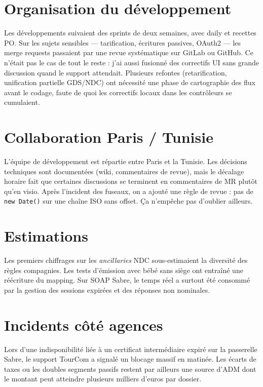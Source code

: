 \section{Organisation du développement}

Les développements suivaient des sprints de deux semaines, avec daily et recettes PO. Sur les sujets sensibles --- tarification, écritures passives, OAuth2 --- les merge requests passaient par une revue systématique sur GitLab ou GitHub. Ce n'était pas le cas de tout le reste : j'ai aussi fusionné des correctifs UI sans grande discussion quand le support attendait. Plusieurs refontes (retarification, unification partielle GDS/NDC) ont nécessité une phase de cartographie des flux avant le codage, faute de quoi les correctifs locaux dans les contrôleurs se cumulaient.

\section{Collaboration Paris / Tunisie}

L'équipe de développement est répartie entre Paris et la Tunisie. Les décisions techniques sont documentées (wiki, commentaires de revue), mais le décalage horaire fait que certaines discussions se terminent en commentaires de MR plutôt qu'en visio. Après l'incident des fuseaux, on a ajouté une règle de revue : pas de \texttt{new Date()} sur une chaîne ISO sans offset. Ça n'empêche pas d'oublier ailleurs.

\section{Estimations}

Les premiers chiffrages sur les \textit{ancillaries} NDC sous-estimaient la diversité des règles compagnies. Les tests d'émission avec bébé sans siège ont entraîné une réécriture du mapping. Sur SOAP Sabre, le temps réel a surtout été consommé par la gestion des sessions expirées et des réponses non nominales.

\section{Incidents côté agences}

Lors d'une indisponibilité liée à un certificat intermédiaire expiré sur la passerelle Sabre, le support TourCom a signalé un blocage massif en matinée. Les écarts de taxes ou les doubles segments passifs restent par ailleurs une source d'ADM dont le montant peut atteindre plusieurs milliers d'euros par dossier.

